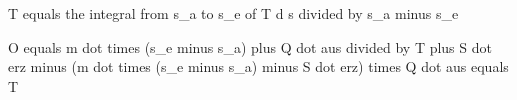T equals the integral from s_a to s_e of T d s divided by s_a minus s_e  

O equals m dot times (s_e minus s_a) plus Q dot aus divided by T plus S dot erz minus (m dot times (s_e minus s_a) minus S dot erz) times Q dot aus equals T